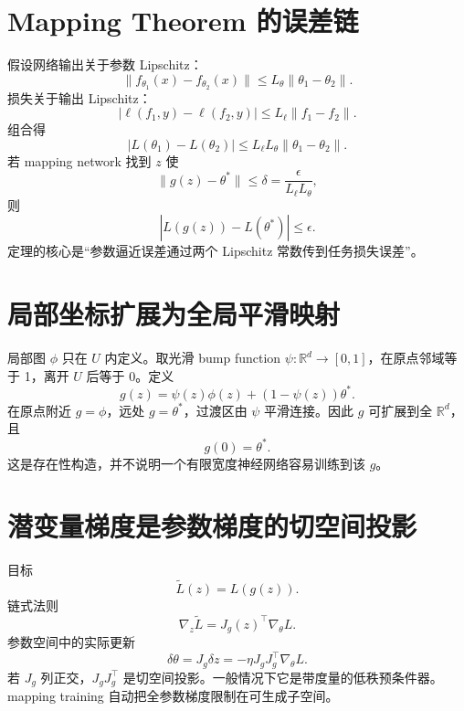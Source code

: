 \documentclass[UTF8,12pt,a4paper,fontset=none]{ctexart}
\numberwithin{equation}{section}
\newcommand{\R}{\mathbb{R}}
\begin{document}
\section{Mapping Theorem 的误差链}
假设网络输出关于参数 Lipschitz：
\begin{equation}
 \|f_{\theta_1}(x)-f_{\theta_2}(x)\|
 \le L_\theta\|\theta_1-\theta_2\|.
\end{equation}
损失关于输出 Lipschitz：
\begin{equation}
 |\ell(f_1,y)-\ell(f_2,y)|
 \le L_\ell\|f_1-f_2\|.
\end{equation}
组合得
\begin{equation}
 |L(\theta_1)-L(\theta_2)|
 \le L_\ell L_\theta
 \|\theta_1-\theta_2\|.
\end{equation}
若 mapping network 找到 $z$ 使
\begin{equation}
 \|g(z)-\theta^*\|
 \le\delta=\frac\epsilon{L_\ell L_\theta},
\end{equation}
则
\begin{equation}
 |L(g(z))-L(\theta^*)|\le\epsilon.
\end{equation}
定理的核心是“参数逼近误差通过两个 Lipschitz 常数传到任务损失误差”。

\section{局部坐标扩展为全局平滑映射}
局部图 $\phi$ 只在 $U$ 内定义。取光滑 bump function $\psi:\R^d\to[0,1]$，在原点邻域等于 1，离开 $U$ 后等于 0。定义
\begin{equation}
 g(z)=\psi(z)\phi(z)+(1-\psi(z))\theta^*.
\end{equation}
在原点附近 $g=\phi$，远处 $g=\theta^*$，过渡区由 $\psi$ 平滑连接。因此 $g$ 可扩展到全 $\R^d$，且
\begin{equation}
 g(0)=\theta^*.
\end{equation}
这是存在性构造，并不说明一个有限宽度神经网络容易训练到该 $g$。

\section{潜变量梯度是参数梯度的切空间投影}
目标
\begin{equation}
 \widetilde L(z)=L(g(z)).
\end{equation}
链式法则
\begin{equation}
 \nabla_z\widetilde L=J_g(z)^\top\nabla_\theta L.
\end{equation}
参数空间中的实际更新
\begin{equation}
 \delta\theta=J_g\delta z
 =-\eta J_gJ_g^\top\nabla_\theta L.
\end{equation}
若 $J_g$ 列正交，$J_gJ_g^\top$ 是切空间投影。一般情况下它是带度量的低秩预条件器。mapping training 自动把全参数梯度限制在可生成子空间。
\end{document}
